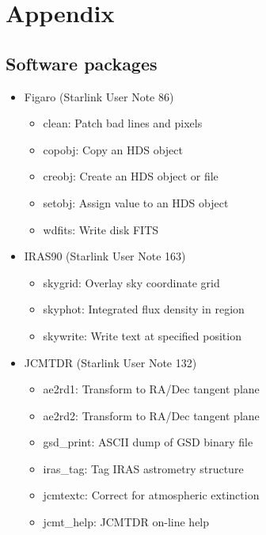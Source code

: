 \documentclass[11pt]{article}
\newcommand{\xref}[3]{#1}
\newcommand{\xlabel}[1]{}
\begin{document}
\newpage
\appendix
\section{Appendix}

\subsection{\label{packs}\xlabel{packs}Software packages}

\begin{itemize}
\item Figaro \xref{(Starlink User Note 86)}{sun86}{}
   \begin{itemize}
   \item \xref{clean}{sun86}{CLEAN}: Patch bad lines and pixels
   \item \xref{copobj}{sun86}{COPOBJ}: Copy an HDS object
   \item \xref{creobj}{sun86}{CREOBJ}: Create an HDS object or file
   \item \xref{setobj}{sun86}{SETOBJ}: Assign value to an HDS object
   \item \xref{wdfits}{sun86}{WDFITS}: Write disk FITS
   \end{itemize}
\item IRAS90 \xref{(Starlink User Note 163)}{sun163}{}
   \begin{itemize}
   \item \xref{skygrid}{sun163}{SKYGRID}: Overlay sky coordinate grid
   \item \xref{skyphot}{sun163}{SKYPHOT}: Integrated flux density in region
   \item \xref{skywrite}{sun163}{SKYWRITE}: Write text at specified position
   \end{itemize}
\item JCMTDR \xref{(Starlink User Note 132)}{sun132}{}
   \begin{itemize}
   \item \xref{ae2rd1}{sun132}{AE2RD1}: Transform to RA/Dec tangent plane
   \item \xref{ae2rd2}{sun132}{AE2RD2}: Transform to RA/Dec tangent plane
   \item \xref{gsd\_print}{sun132}{GSD_PRINT}: ASCII dump of GSD binary file
   \item \xref{iras\_tag}{sun132}{IRAS_TAG}: Tag IRAS astrometry structure
   \item \xref{jcmtextc}{sun132}{JCMTEXTC}: Correct for atmospheric extinction
   \item \xref{jcmt\_help}{sun132}{JCMT_HELP}: JCMTDR on-line help

\end{itemize}
\end{itemize}
\end{document}
